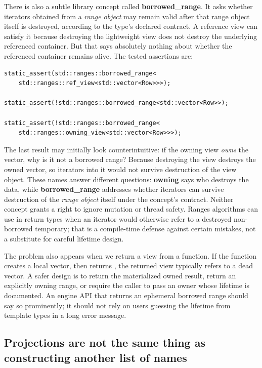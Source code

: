 There is also a subtle library concept called \textbf{borrowed\_range}. It asks whether iterators obtained from a \emph{range object} may remain valid after that range object itself is destroyed, according to the type's declared contract. A reference view can satisfy it because destroying the lightweight view does not destroy the underlying referenced container. But that says absolutely nothing about whether the referenced container remains alive. The tested assertions are:

\begin{verbatim}
static_assert(std::ranges::borrowed_range<
    std::ranges::ref_view<std::vector<Row>>>);

static_assert(!std::ranges::borrowed_range<std::vector<Row>>);

static_assert(!std::ranges::borrowed_range<
    std::ranges::owning_view<std::vector<Row>>>);
\end{verbatim}

The last result may initially look counterintuitive: if the owning view \emph{owns} the vector, why is it not a borrowed range? Because destroying the view destroys the owned vector, so iterators into it would not survive destruction of the view object. These names answer different questions: \textbf{owning} says who destroys the data, while \textbf{borrowed\_range} addresses whether iterators can survive destruction of the \emph{range object} itself under the concept's contract. Neither concept grants a right to ignore mutation or thread safety. Ranges algorithms can use  in return types when an iterator would otherwise refer to a destroyed non-borrowed temporary; that is a compile-time defense against certain mistakes, not a substitute for careful lifetime design.

The problem also appears when we return a view from a function. If the function creates a local vector, then returns , the returned view typically refers to a dead vector. A safer design is to return the materialized owned result, return an explicitly owning range, or require the caller to pass an owner whose lifetime is documented. An engine API that returns an ephemeral borrowed range should say so prominently; it should not rely on users guessing the lifetime from template types in a long error message.

\subsection{Projections are not the same thing as constructing another list of names}\label{05-engine-i-ch006-projections-are-not-the-same-thing-as-constructing-another-list-of-names}

